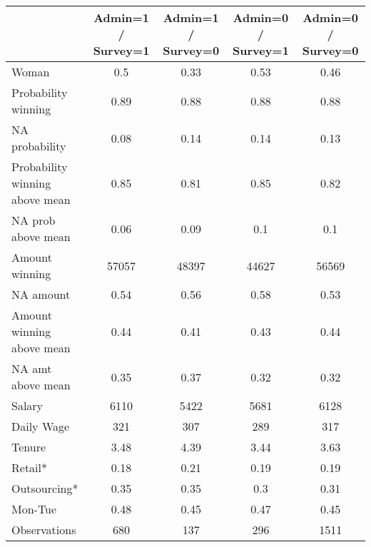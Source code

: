 \begin{tabular}{lcccc}
\toprule
      & Admin=1 / Survey=1 & Admin=1 / Survey=0 & Admin=0 / Survey=1 & Admin=0 / Survey=0 \\
\midrule
\midrule
Woman & 0.5   & 0.33  & 0.53  & 0.46 \\
Probability winning & 0.89  & 0.88  & 0.88  & 0.88 \\
NA probability & 0.08  & 0.14  & 0.14  & 0.13 \\
Probability winning above mean & 0.85  & 0.81  & 0.85  & 0.82 \\
NA prob above mean & 0.06  & 0.09  & 0.1   & 0.1 \\
Amount winning & 57057 & 48397 & 44627 & 56569 \\
NA amount & 0.54  & 0.56  & 0.58  & 0.53 \\
Amount winning above mean & 0.44  & 0.41  & 0.43  & 0.44 \\
NA amt above mean & 0.35  & 0.37  & 0.32  & 0.32 \\
Salary & 6110  & 5422  & 5681  & 6128 \\
Daily Wage & 321   & 307   & 289   & 317 \\
Tenure & 3.48  & 4.39  & 3.44  & 3.63 \\
Retail* & 0.18  & 0.21  & 0.19  & 0.19 \\
Outsourcing* & 0.35  & 0.35  & 0.3   & 0.31 \\
Mon-Tue & 0.48  & 0.45  & 0.47  & 0.45 \\
\midrule
Observations & 680   & 137   & 296   & 1511 \\
\bottomrule
\bottomrule
\end{tabular}%
